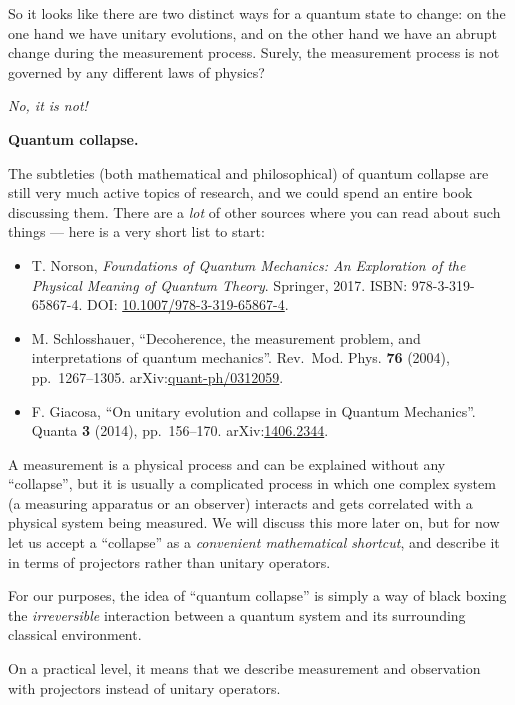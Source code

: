 \documentclass[fleqn,a4paper]{article}
\providecommand{\tightlist}{\setlength{\itemsep}{0pt}\setlength{\parskip}{0pt}}
\newenvironment{idea}{\everypar{\setlength{\parindent}{1.5em}}}{}
\newenvironment{technical}[1]{\textbf{#1.}\par\vspace{.5\baselineskip}\everypar{\setlength{\parindent}{1.5em}}}{}
\theoremstyle{definition}
\theoremstyle{definition}
\theoremstyle{definition}
\theoremstyle{definition}
\theoremstyle{remark}
\begin{document}
So it looks like there are two distinct ways for a quantum state to change: on the one hand we have unitary evolutions, and on the other hand we have an abrupt change during the measurement process.
Surely, the measurement process is not governed by any different laws of physics?

\emph{No, it is not!}

\begin{technical}{Quantum collapse}

The subtleties (both mathematical and philosophical) of quantum collapse are still very much active topics of research, and we could spend an entire book discussing them.
There are a \emph{lot} of other sources where you can read about such things --- here is a very short list to start:

\begin{itemize}
\tightlist
\item
  T. Norson, \emph{Foundations of Quantum Mechanics: An Exploration of the Physical Meaning of Quantum Theory}. Springer, 2017. ISBN: 978-3-319-65867-4. DOI: \href{https://doi.org/10.1007/978-3-319-65867-4}{10.1007/978-3-319-65867-4}.
\item
  M. Schlosshauer, ``Decoherence, the measurement problem, and interpretations of quantum mechanics''. Rev.~Mod. Phys. \textbf{76} (2004), pp.~1267--1305. arXiv:\href{https://arxiv.org/abs/quant-ph/0312059}{quant-ph/0312059}.
\item
  F. Giacosa, ``On unitary evolution and collapse in Quantum Mechanics''. Quanta \textbf{3} (2014), pp.~156--170. arXiv:\href{https://arxiv.org/abs/1406.2344}{1406.2344}.
\end{itemize}

\end{technical}

A measurement is a physical process and can be explained without any ``collapse'', but it is usually a complicated process in which one complex system (a measuring apparatus or an observer) interacts and gets correlated with a physical system being measured.
We will discuss this more later on, but for now let us accept a ``collapse'' as a \emph{convenient mathematical shortcut}, and describe it in terms of projectors rather than unitary operators.

\begin{idea}
For our purposes, the idea of ``quantum collapse'' is simply a way of black boxing the \emph{irreversible} interaction between a quantum system and its surrounding classical environment.

On a practical level, it means that we describe measurement and observation with projectors instead of unitary operators.

\end{idea}
\end{document}
